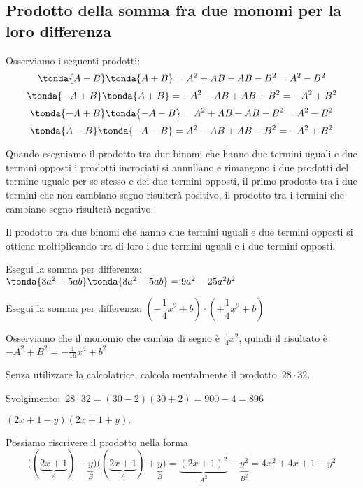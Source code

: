 \subsection{Prodotto della somma fra due monomi per la loro differenza}
\label{subsec:11_prodnot_sommaperdifferenza}

Osserviamo i seguenti prodotti:
\[\tonda{A-B}\tonda{A+B}=A^{2}+{AB}-{AB}-B^{2}=A^{2}-B^{2}\]
\[\tonda{-A+B}\tonda{A+B}=-A^{2}-{AB}+{AB}+B^{2}=-A^{2}+B^{2}\]
\[\tonda{-A+B}\tonda{-A-B}=A^{2}+{AB}-{AB}-B^{2}=A^{2}-B^{2}\]
\[\tonda{A-B}\tonda{-A-B}=A^{2}-{AB}+{AB}-B^{2}=-A^{2}+B^{2}\]

Quando eseguiamo il prodotto tra due binomi che hanno due
termini uguali e due termini opposti i prodotti incrociati si annullano
e rimangono i due prodotti del termine uguale per se stesso e dei due
termini opposti, il primo prodotto tra i due termini che non cambiano 
segno risulterà positivo, il prodotto tra i termini che cambiano segno 
risulterà negativo. 

\osservazione Il prodotto tra due binomi che hanno due termini
uguali e due termini opposti si ottiene moltiplicando tra di loro i due 
termini uguali e i due termini opposti.

\begin{esempio}
Esegui la somma per differenza:\\
\(\tonda{3a^{2}+5{ab}} \tonda{3a^{2}-5{ab}}=
9a^{2}-25a^{2}b^{2}\)
\end{esempio}

\begin{esempio}
Esegui la somma per differenza:
 \(\left(-{\dfrac{1}{4}}x^{2}+b\right)\cdot 
\left(+{\dfrac{1}{4}}x^{2}+b\right)\)

Osserviamo che il monomio che cambia di segno è~\(\frac{1}{4}x^{2}\),
quindi il risultato è ~\(-A^{2}+B^{2}=-\frac{1}{16}x^{4}+b^{2}\)
\end{esempio}

\begin{esempio}
Senza utilizzare la calcolatrice, calcola mentalmente il prodotto~\(28\cdot 
32\).

Svolgimento:~\(28\cdot 32=(30-2)(30+2)=900-4=896\)
\end{esempio}

\begin{esempio}
\((2x+1-y)(2x+1+y).\)

Possiamo riscrivere il prodotto nella forma
\[\big((\underbrace{2x+1}_{A})-\underbrace{y}_{B}\big)\big((\underbrace{2x+1
}_{A})+\underbrace{y}_{B}\big)=\underbrace{(2x+1)^{2}}_{A^{2}}-\underbrace{
y^{2}}_{B^{2}}=4x^{2}+4x+1-y^{2}\]
\end{esempio}

